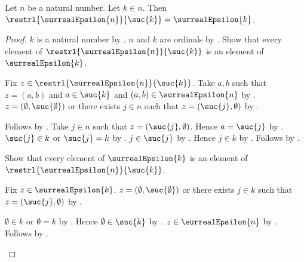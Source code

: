 \begin{proposition}\label{surreal_epsilon_restriction}
    Let $n$ be a natural number.
    Let $k\in n$.
    Then $\restrl{\surrealEpsilon{n}}{\suc{k}}
        =\surrealEpsilon{k}$.
\end{proposition}
\begin{proof}
    $k$ is a natural number
        by .
    $n$ and $k$ are ordinals by .
    Show that every element of
        $\restrl{\surrealEpsilon{n}}{\suc{k}}$ is an element of
        $\surrealEpsilon{k}$.
    \begin{subproof}
        Fix $z\in\restrl{\surrealEpsilon{n}}{\suc{k}}$.
        Take $a,b$ such that $z=(a,b)$ and $a\in\suc{k}$ and
            $(a,b)\in\surrealEpsilon{n}$
            by .
        $z=(\emptyset,\suc{\emptyset})$ or
            there exists $j\in n$ such that
                $z=(\suc{j},\emptyset)$
            by .
        \begin{byCase}
                Follows by .
                Take $j\in n$ such that $z=(\suc{j},\emptyset)$.
                Hence $a=\suc{j}$ by .
                $\suc{j}\in k$ or $\suc{j}=k$
                    by .
                $j\in\suc{j}$ by .
                Hence $j\in k$ by .
                Follows by .
        \end{byCase}
    \end{subproof}
    Show that every element of $\surrealEpsilon{k}$ is an element of
        $\restrl{\surrealEpsilon{n}}{\suc{k}}$.
    \begin{subproof}
        Fix $z\in\surrealEpsilon{k}$.
        $z=(\emptyset,\suc{\emptyset})$ or
            there exists $j\in k$ such that
                $z=(\suc{j},\emptyset)$
            by .
        \begin{byCase}
                $\emptyset\in k$ or $\emptyset=k$
                    by .
                Hence $\emptyset\in\suc{k}$ by .
                $z\in\surrealEpsilon{n}$
                    by .
                Follows by .

\end{byCase}
\end{subproof}
\end{proof}
